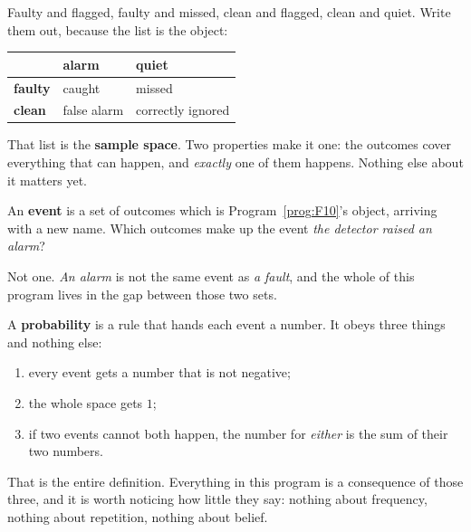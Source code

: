 \begin{fr}

Faulty and flagged, faulty and missed, clean and flagged, clean and quiet.
Write them out, because the list is the object:

\begin{center}
\begin{tabular}{lll}
\toprule
& \textbf{alarm} & \textbf{quiet} \\
\midrule
\textbf{faulty} & caught & missed \\
\textbf{clean}  & false alarm & correctly ignored \\
\bottomrule
\end{tabular}
\end{center}

That list is the \textbf{sample space}. Two properties make
it one: the
outcomes cover everything that can happen, and \emph{exactly} one of them
happens. Nothing else about it matters yet.

An \textbf{event} is a set of outcomes \dash{} which is Program~\ref{prog:F10}'s
object, arriving with a new name. Which outcomes make up the event
\emph{the detector raised an alarm}?
\dotline
\nextframe
\end{fr}

\begin{fr}

Not one. \emph{An alarm} is not the same event as \emph{a fault}, and the whole
of this program lives in the gap between those two sets.

A \textbf{probability} is a rule that hands each event a number. It obeys three
things and nothing else:

\begin{enumerate}
\item every event gets a number that is not negative;
\item the whole space gets $1$;
\item if two events cannot both happen, the number for \emph{either} is the sum
  of their two numbers.
\end{enumerate}

That is the entire definition. Everything in this program is a consequence of
those three, and it is worth noticing how little they say: nothing about
frequency, nothing about repetition, nothing about belief.

\end{fr}

